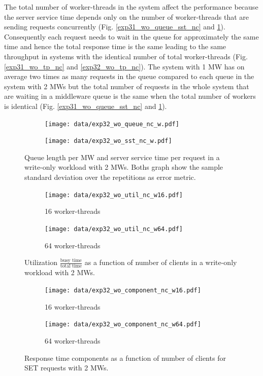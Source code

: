 \documentclass[report.tex]{subfiles}
\begin{document}
The total number of worker-threads in the system affect the performance because the server service time depends only on the number of worker-threads that are sending requests concurrently (Fig. \ref{exp31_wo_queue_sst_nc} and \ref{exp32_wo_queue_sst_nc}).
Consequently each request needs to wait in the queue for approximately the same time and hence the total response time is the same leading to the same throughput in systems with the identical number of total worker-threads (Fig. \ref{exp31_wo_tp_nc} and \ref{exp32_wo_tp_nc}).
The system with 1 MW has on average two times as many requests in the queue compared to each queue in the system with 2 MWs 
but the total number of requests in the whole system that are waiting in a middleware queue is the same when the total number of workers is identical (Fig. \ref{exp31_wo_queue_sst_nc} and \ref{exp32_wo_queue_sst_nc}).
\vspace{-2mm}

\begin{figure}[H]
	\begin{subfigure}[b]{.499\linewidth}
		\centering
		\texttt{[image: data/exp32\_wo\_queue\_nc\_w.pdf]}
	\end{subfigure}\hfill
	\begin{subfigure}[b]{.499\linewidth}
		\centering
		\texttt{[image: data/exp32\_wo\_sst\_nc\_w.pdf]}
	\end{subfigure}\hfill
	\caption{Queue length per MW and server service time per request in a write-only workload with 2 MWs. Boths graph show the sample standard deviation over the repetitions as error metric.}\label{exp32_wo_queue_sst_nc}
\end{figure}

\begin{figure}[H]
	\begin{subfigure}[b]{.499\linewidth}
		\centering
		\texttt{[image: data/exp32\_wo\_util\_nc\_w16.pdf]}
		\caption{16 worker-threads}
	\end{subfigure}\hfill
	\begin{subfigure}[b]{.499\linewidth}
		\centering
		\texttt{[image: data/exp32\_wo\_util\_nc\_w64.pdf]}
		\caption{64 worker-threads}
	\end{subfigure}\hfill
	\caption{Utilization $\frac{\text{busy time}}{\text{total time}}$ as a function of number of clients in a write-only workload with 2 MWs.}\label{exp32_wo_util_nc}
\end{figure}

\begin{figure}[H]
	\begin{subfigure}[b]{.499\linewidth}
		\centering
		\texttt{[image: data/exp32\_wo\_component\_nc\_w16.pdf]}
		\caption{16 worker-threads}
	\end{subfigure}\hfill
	\begin{subfigure}[b]{.499\linewidth}
		\centering
		\texttt{[image: data/exp32\_wo\_component\_nc\_w64.pdf]}
		\caption{64 worker-threads}
	\end{subfigure}\hfill
	\caption{Response time components as a function of number of clients for SET requests with 2 MWs.}\label{exp32_wo_rtcomp_nc}
\end{figure}
\end{document}
